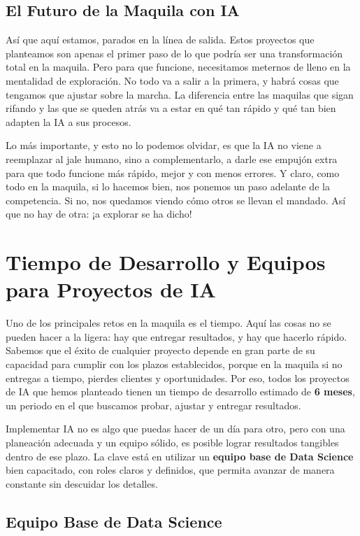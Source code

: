 \subsection{El Futuro de la Maquila con IA}

Así que aquí estamos, parados en la línea de salida. Estos proyectos que planteamos son apenas el primer paso de lo que podría ser una transformación total en la maquila. Pero para que funcione, necesitamos meternos de lleno en la mentalidad de exploración. No todo va a salir a la primera, y habrá cosas que tengamos que ajustar sobre la marcha. La diferencia entre las maquilas que sigan rifando y las que se queden atrás va a estar en qué tan rápido y qué tan bien adapten la IA a sus procesos.

Lo más importante, y esto no lo podemos olvidar, es que la IA no viene a reemplazar al jale humano, sino a complementarlo, a darle ese empujón extra para que todo funcione más rápido, mejor y con menos errores. Y claro, como todo en la maquila, si lo hacemos bien, nos ponemos un paso adelante de la competencia. Si no, nos quedamos viendo cómo otros se llevan el mandado. Así que no hay de otra: ¡a explorar se ha dicho!

\section{Tiempo de Desarrollo y Equipos para Proyectos de IA}

Uno de los principales retos en la maquila es el tiempo. Aquí las cosas no se pueden hacer a la ligera: hay que entregar resultados, y hay que hacerlo rápido. Sabemos que el éxito de cualquier proyecto depende en gran parte de su capacidad para cumplir con los plazos establecidos, porque en la maquila si no entregas a tiempo, pierdes clientes y oportunidades. Por eso, todos los proyectos de IA que hemos planteado tienen un tiempo de desarrollo estimado de \textbf{6 meses}, un periodo en el que buscamos probar, ajustar y entregar resultados.

Implementar IA no es algo que puedas hacer de un día para otro, pero con una planeación adecuada y un equipo sólido, es posible lograr resultados tangibles dentro de ese plazo. La clave está en utilizar un \textbf{equipo base de Data Science} bien capacitado, con roles claros y definidos, que permita avanzar de manera constante sin descuidar los detalles.

\subsection{Equipo Base de Data Science}

